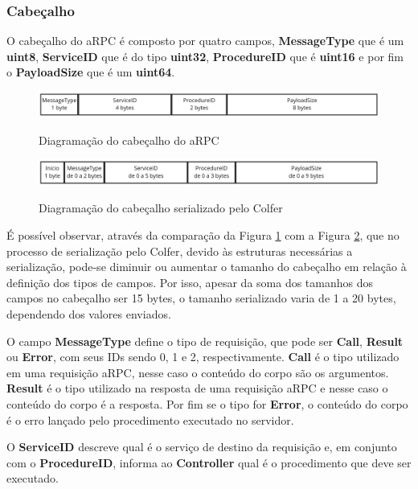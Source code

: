 \subsubsection{Cabeçalho}

O cabeçalho do aRPC é composto por quatro campos, \textbf{MessageType} que é um \textbf{uint8}, \textbf{ServiceID} que é do tipo \textbf{uint32}, \textbf{ProcedureID} que é \textbf{uint16} e por fim o \textbf{PayloadSize} que é um \textbf{uint64}.

\begin{figure}[ht]
    \centering
    \caption{Diagramação do cabeçalho do aRPC}
    \includegraphics[width=\textwidth]{figuras/diagramas/cap3/arpc_header.png} 
    \label{fig:arpc_header}
\end{figure}

\begin{figure}[ht]
    \centering
    \caption{Diagramação do cabeçalho serializado pelo Colfer}
    \includegraphics[width=\textwidth]{figuras/diagramas/cap3/arpc_header_colfer.png} 
    \label{fig:arpc_header_colfer}
\end{figure}

É possível observar, através da comparação da Figura \ref{fig:arpc_header} com a Figura \ref{fig:arpc_header_colfer}, que no processo de serialização pelo Colfer, devido às estruturas necessárias a serialização, pode-se diminuir ou aumentar o tamanho do cabeçalho em relação à definição dos tipos de campos. Por isso, apesar da soma dos tamanhos dos campos no cabeçalho ser 15 bytes, o tamanho serializado varia de 1 a 20 bytes, dependendo dos valores enviados.

O campo \textbf{MessageType} define o tipo de requisição, que pode ser \textbf{Call}, \textbf{Result} ou \textbf{Error}, com seus IDs sendo 0, 1 e 2, respectivamente. \textbf{Call} é o tipo utilizado em uma requisição aRPC, nesse caso o conteúdo do corpo são os argumentos. \textbf{Result} é o tipo utilizado na resposta de uma requisição aRPC e nesse caso o conteúdo do corpo é a resposta. Por fim se o tipo for \textbf{Error}, o conteúdo do corpo é o erro lançado pelo procedimento executado no servidor.

O \textbf{ServiceID} descreve qual é o serviço de destino da requisição e, em conjunto com o \textbf{ProcedureID}, informa ao \textbf{Controller} qual é o procedimento que deve ser executado.

